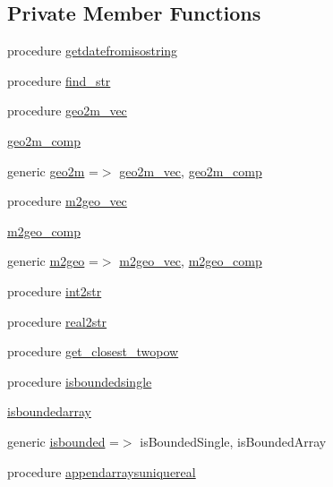 \subsection*{Private Member Functions}
\begin{DoxyCompactItemize}
\item 
procedure \mbox{\hyperlink{structutilities__mod_1_1utils__class_af2c6e40cca9f6f643105eef0c16f09aa}{getdatefromisostring}}
\item 
procedure \mbox{\hyperlink{structutilities__mod_1_1utils__class_a70fcd702c2e81aaf574c3e031b7b0fef}{find\+\_\+str}}
\item 
procedure \mbox{\hyperlink{structutilities__mod_1_1utils__class_a37ba4d9fc1c6ef99561627f05c82cf7e}{geo2m\+\_\+vec}}
\item 
\mbox{\hyperlink{structutilities__mod_1_1utils__class_ab41bb5a8810e938810f0d08c42c312c9}{geo2m\+\_\+comp}}
\item 
generic \mbox{\hyperlink{structutilities__mod_1_1utils__class_abe6b57e722392dec127bb426c9b0e41f}{geo2m}} =$>$ \mbox{\hyperlink{structutilities__mod_1_1utils__class_a37ba4d9fc1c6ef99561627f05c82cf7e}{geo2m\+\_\+vec}}, \mbox{\hyperlink{structutilities__mod_1_1utils__class_ab41bb5a8810e938810f0d08c42c312c9}{geo2m\+\_\+comp}}
\item 
procedure \mbox{\hyperlink{structutilities__mod_1_1utils__class_a8319bf9d14dd225be0f30f5e0c1f04e3}{m2geo\+\_\+vec}}
\item 
\mbox{\hyperlink{structutilities__mod_1_1utils__class_a8cceeee65240f821428cd4dc65fd5fa0}{m2geo\+\_\+comp}}
\item 
generic \mbox{\hyperlink{structutilities__mod_1_1utils__class_a345230eb5aac79b78603538f0fd0e36e}{m2geo}} =$>$ \mbox{\hyperlink{structutilities__mod_1_1utils__class_a8319bf9d14dd225be0f30f5e0c1f04e3}{m2geo\+\_\+vec}}, \mbox{\hyperlink{structutilities__mod_1_1utils__class_a8cceeee65240f821428cd4dc65fd5fa0}{m2geo\+\_\+comp}}
\item 
procedure \mbox{\hyperlink{structutilities__mod_1_1utils__class_ae3a7fea394d64f5f4592504841b07777}{int2str}}
\item 
procedure \mbox{\hyperlink{structutilities__mod_1_1utils__class_a150e3763affd525139f135d6cbbca026}{real2str}}
\item 
procedure \mbox{\hyperlink{structutilities__mod_1_1utils__class_a2fa5e32b744821f0c74e30aeb99e1e2b}{get\+\_\+closest\+\_\+twopow}}
\item 
procedure \mbox{\hyperlink{structutilities__mod_1_1utils__class_aac36fc53d19b8bd8c37a2dfcf74f1fcc}{isboundedsingle}}
\item 
\mbox{\hyperlink{structutilities__mod_1_1utils__class_ae513529301733a624bcb1e984131edcd}{isboundedarray}}
\item 
generic \mbox{\hyperlink{structutilities__mod_1_1utils__class_acd0be828aa3a873c635cb9742ef06b13}{isbounded}} =$>$ is\+Bounded\+Single, is\+Bounded\+Array
\item 
procedure \mbox{\hyperlink{structutilities__mod_1_1utils__class_aeb0f0bfbea1b5a1d1dc5ed88abd272fb}{appendarraysuniquereal}}
\end{DoxyCompactItemize}


